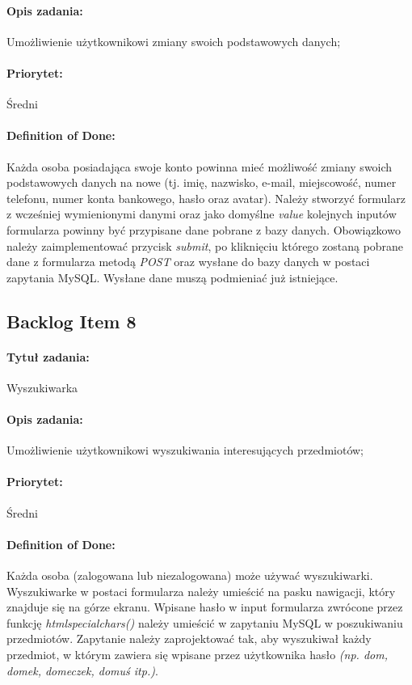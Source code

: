 \documentclass[a4paper]{article}
\begin{document}
	\paragraph{Opis zadania:} Umożliwienie użytkownikowi zmiany swoich podstawowych danych;
	\paragraph{Priorytet:} Średni
	\paragraph{Definition of Done:} Każda osoba posiadająca swoje konto powinna mieć możliwość zmiany swoich podstawowych danych na nowe (tj. imię, nazwisko, e-mail, miejscowość, numer telefonu, numer konta bankowego, hasło oraz avatar). Należy stworzyć formularz z wcześniej wymienionymi danymi oraz jako domyślne \emph{value} kolejnych inputów formularza powinny być przypisane dane pobrane z bazy danych. Obowiązkowo należy zaimplementować przycisk \emph{submit}, po kliknięciu którego zostaną pobrane dane z formularza metodą \emph{POST} oraz wysłane do bazy danych w postaci zapytania MySQL. Wysłane dane muszą podmieniać już istniejące.
	
	\subsection{Backlog Item 8}
	\paragraph{Tytuł zadania:} Wyszukiwarka
	\paragraph{Opis zadania:} Umożliwienie użytkownikowi wyszukiwania interesujących przedmiotów;
	\paragraph{Priorytet:} Średni
	\paragraph{Definition of Done:} Każda osoba (zalogowana lub niezalogowana) może używać wyszukiwarki. Wyszukiwarke w postaci formularza należy umieścić na pasku nawigacji, który znajduje się na górze ekranu. Wpisane hasło w input formularza zwrócone przez funkcję \emph{htmlspecialchars()} należy umieścić w zapytaniu MySQL w poszukiwaniu przedmiotów. Zapytanie należy zaprojektować tak, aby wyszukiwał każdy przedmiot, w którym zawiera się wpisane przez użytkownika hasło \emph{(np. dom, domek, domeczek, domuś itp.)}.
	
\end{document}

